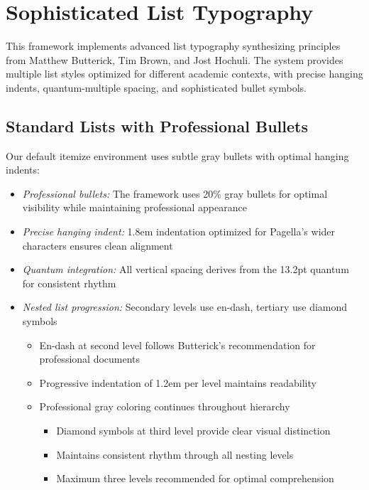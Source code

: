 \documentclass[11pt]{article}
\begin{document}
\clearpage

\section{Sophisticated List Typography}

This framework implements advanced list typography synthesizing principles from Matthew Butterick, Tim Brown, and Jost Hochuli. The system provides multiple list styles optimized for different academic contexts, with precise hanging indents, quantum-multiple spacing, and sophisticated bullet symbols.

\subsection{Standard Lists with Professional Bullets}

Our default itemize environment uses subtle gray bullets with optimal hanging indents:

\begin{itemize}
\item \emph{Professional bullets:} The framework uses 20\% gray bullets for optimal visibility while maintaining professional appearance
\item \emph{Precise hanging indent:} 1.8em indentation optimized for Pagella's wider characters ensures clean alignment
\item \emph{Quantum integration:} All vertical spacing derives from the 13.2pt quantum for consistent rhythm
\item \emph{Nested list progression:} Secondary levels use en-dash, tertiary use diamond symbols
  \begin{itemize}
  \item En-dash at second level follows Butterick's recommendation for professional documents
  \item Progressive indentation of 1.2em per level maintains readability
  \item Professional gray coloring continues throughout hierarchy
    \begin{itemize}
    \item Diamond symbols at third level provide clear visual distinction
    \item Maintains consistent rhythm through all nesting levels
    \item Maximum three levels recommended for optimal comprehension
    \end{itemize}
  \end{itemize}
\end{itemize}
\end{document}
